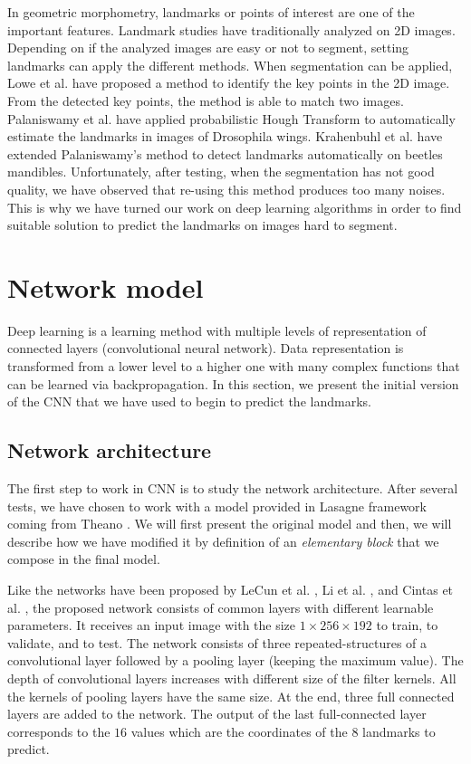 \documentclass[10pt]{article}
\begin{document}
In geometric morphometry, landmarks or points of interest are one of
the important features. Landmark studies have traditionally
analyzed on 2D images. Depending on if the analyzed images are
easy or not to segment, setting landmarks can apply
the different methods. When segmentation can be applied, Lowe et
al. \cite{lowe2004distinctive} have proposed a method to identify the
key points in the 2D image. From the detected key points, the method
is able to match two images. Palaniswamy et
al. \cite{palaniswamy2010automatic} have applied probabilistic Hough
Transform to automatically estimate the landmarks in images of
Drosophila wings. Krahenbuhl et al. \cite{le2017maelab} have extended
Palaniswamy's method to detect landmarks automatically on beetles
mandibles. Unfortunately, after testing, when the segmentation has not good quality,
we have observed that re-using this method produces too many
noises. This is why we have turned our work on deep learning
algorithms in order to find suitable solution to predict the landmarks
on images hard to segment.


\section{Network model}
Deep learning is a learning method with multiple levels of
representation of connected layers (convolutional neural
network). Data representation is transformed from a lower level to a
higher one with many complex functions that can be learned via
backpropagation. In this section, we present the initial version of the CNN that we have used
to begin to predict the landmarks. 

\subsection{Network architecture}
\label{secmodel}
The first step to work in CNN is to study the network
architecture. After several tests, we have chosen to work with a model provided in Lasagne framework \cite{lasagne} coming from
Theano \cite{2016arXiv160502688short}. We will first present the
original model and then, we will describe how we have modified it by definition of an
\textit{elementary block} that we compose in the final model.

Like the networks have been proposed by LeCun et al. \cite{lecun2010convolutional}, Li et al. \cite{li2015convolutional}, and Cintas et al. \cite{cintas2016automatic}, the proposed network consists of common layers
with different learnable parameters. It receives an input image with
the size  $1 \times 256 \times 192$ to train, to validate, and to
test. The network consists of three repeated-structures of a convolutional layer
followed by a pooling layer (keeping the maximum value). The depth of convolutional layers increases with different size of the filter kernels.
All the kernels of pooling layers have the same size. 
At the end, three full connected layers are added to the
network. The output of the last full-connected
layer corresponds to the $16$ values which are the coordinates of the
$8$ landmarks to predict.
\end{document}
